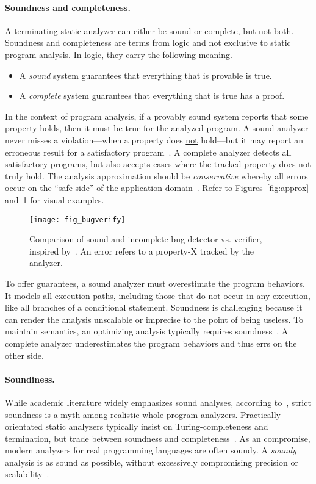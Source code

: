 \paragraph*{Soundness and completeness.}
A terminating static analyzer can either be sound or complete, but not both.
Soundness and completeness are terms from logic and not exclusive to static program analysis.
In logic, they carry the following meaning.
\begin{itemize}
\item A \emph{sound} system guarantees that everything that is provable is true.
\item A \emph{complete} system guarantees that everything that is true has a proof.
\end{itemize}
In the context of program analysis,
if a provably sound system reports that some property holds, then it must be true for the analyzed program.
A sound analyzer never misses a violation---\ie when a property does \underline{not} hold---but it may report an erroneous result for a satisfactory program~\cite{torlak2015}.
A complete analyzer detects all satisfactory programs, but also accepts cases where the tracked property does not truly hold.
The analysis approximation should be \emph{conservative}
whereby all errors occur on the \enquote{safe side} of the application domain~\cite[p. 5]{moller2023}.
Refer to Figures~\ref{fig:approx} and~\ref{fig:bug-verify} for visual examples.

\begin{figure}[h]
\centering
\texttt{[image: fig\_bugverify]}
\caption[Sound and incomplete bug detector vs. verifier]{
Comparison of sound and incomplete bug detector vs. verifier, inspired by~\textcite{moller2024}.
An error refers to a property-X tracked by the analyzer.}
\label{fig:bug-verify}
\end{figure}

To offer guarantees, a sound analyzer must overestimate the program behaviors.
It models all execution paths, including those that do not occur in any execution, like all branches of a conditional statement.
Soundness is challenging because it can render the analysis unscalable or imprecise to the point of being useless.
To maintain semantics, an optimizing analysis typically requires soundness~\cite[p. 5]{moller2023}.
A complete analyzer underestimates the program behaviors and thus errs on the other side.

\paragraph*{Soundiness.}
While academic literature widely emphasizes sound analyses, according to~\textcite{livshits2015}, strict soundness is a myth among realistic whole-program analyzers.
Practically-orientated static analyzers typically insist on Turing-completeness and termination,
but trade between soundness and completeness~\cite{moller2023,steffen2020}.
As an compromise, modern analyzers for real programming languages are often soundy.
A \emph{soundy} analysis is as sound as possible, without excessively compromising precision or scalability~\cite{livshits2015}.

